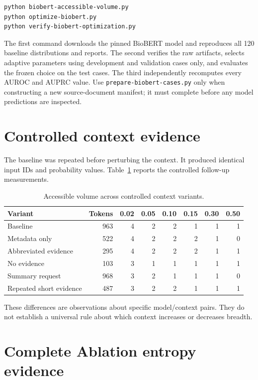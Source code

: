 \documentclass[11pt,a4paper]{article}
\begin{document}
\begin{lstlisting}
python biobert-accessible-volume.py
python optimize-biobert.py
python verify-biobert-optimization.py
\end{lstlisting}

The first command downloads the pinned BioBERT model and reproduces all 120 baseline distributions and reports. The second verifies the raw artifacts, selects adaptive parameters using development and validation cases only, and evaluates the frozen choice on the test cases. The third independently recomputes every AUROC and AUPRC value. Use \texttt{prepare-biobert-cases.py} only when constructing a new source-document manifest; it must complete before any model predictions are inspected.

\section{Controlled context evidence}
The baseline was repeated before perturbing the context. It produced identical input IDs and probability values. Table~\ref{tab:context-proof} reports the controlled follow-up measurements.

{\scriptsize
\begin{table}[h]
\centering
\caption{Accessible volume across controlled context variants.}
\label{tab:context-proof}
\setlength{\tabcolsep}{4pt}
\begin{tabular}{lrrrrrrr}
\toprule
Variant & Tokens & 0.02 & 0.05 & 0.10 & 0.15 & 0.30 & 0.50 \\
\midrule
Baseline & 963 & 4 & 2 & 2 & 1 & 1 & 1 \\
Metadata only & 522 & 4 & 2 & 2 & 2 & 1 & 0 \\
Abbreviated evidence & 295 & 4 & 2 & 2 & 2 & 1 & 1 \\
No evidence & 103 & 3 & 1 & 1 & 1 & 1 & 1 \\
Summary request & 968 & 3 & 2 & 1 & 1 & 1 & 0 \\
Repeated short evidence & 487 & 3 & 2 & 2 & 1 & 1 & 1 \\
\bottomrule
\end{tabular}
\end{table}
}

These differences are observations about specific model/context pairs. They do not establish a universal rule about which context increases or decreases breadth.

\section{Complete Ablation entropy evidence}

\end{document}
